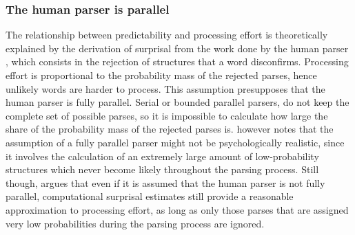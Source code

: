 \subsubsection{The human parser is parallel}
\begin{sloppypar}
The relationship between predictability and processing effort is theoretically explained by the derivation of surprisal from the work done by the human parser \citep{hale2001, levy2008}, which consists in the rejection of structures that a word disconfirms. Processing effort is proportional to the probability mass of the rejected parses, hence unlikely words are harder to process. This assumption presupposes that the human parser is fully parallel. Serial or bounded parallel parsers, do not keep the complete set of possible parses, so it is impossible to calculate how large the share of the probability mass of the rejected parses is. \citet{levy2008} however notes that the assumption of a fully parallel parser might not be psychologically realistic, since it involves the calculation of an extremely large amount of low-probability structures which never become likely throughout the parsing process. Still though, \citet[1135--1136]{levy2008} argues that even if it is assumed that the human parser is not fully parallel, computational surprisal estimates still provide a reasonable approximation to processing effort, as long as only those parses that are assigned very low probabilities during the parsing process are ignored.\end{sloppypar}

